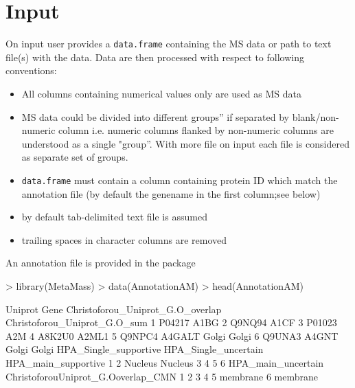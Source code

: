 \documentclass[a4paper]{article}
\numberwithin{equation}{subsection}
\begin{document}
\section{Input}
 On input user provides a
\texttt{data.frame} containing the MS data or path to text file(s)
with the data. Data are
then processed with respect to following conventions:
\begin{itemize}
  \item All columns containing numerical values only are used as MS data
    \item MS data could be divided into different groups'' if separated
      by blank/non-numeric column i.e. numeric columns flanked by
      non-numeric columns are understood as a single "group''.
      With more file on input each file is considered as separate set
      of groups.
    \item \texttt{data.frame} must contain a column containing protein
      ID which match the annotation file (by default the genename in
      the first column;see below)
      \item by default tab-delimited text file is assumed
      \item trailing spaces in character columns are removed
  \end{itemize}
  An annotation file is provided in the package
 \scriptsize
\begin{Schunk}
\begin{Sinput}
> library(MetaMass)
> data(AnnotationAM)
> head(AnnotationAM)
\end{Sinput}
\begin{Soutput}
  Uniprot   Gene Christoforou_Uniprot_G.O_overlap Christoforou_Uniprot_G.O_sum
1  P04217   A1BG                                                              
2  Q9NQ94   A1CF                                                              
3  P01023    A2M                                                              
4  A8K2U0  A2ML1                                                              
5  Q9NPC4 A4GALT                            Golgi                        Golgi
6  Q9UNA3  A4GNT                            Golgi                        Golgi
  HPA_Single_supportive HPA_Single_uncertain HPA_main_supportive
1                                                               
2               Nucleus                                  Nucleus
3                                                               
4                                                               
5                                                               
6                                                               
  HPA_main_uncertain ChristoforouUniprot_G.Ooverlap_CMN
1                                                      
2                                                      
3                                                      
4                                                      
5                                              membrane
6                                              membrane
\end{Soutput}
\end{Schunk}
\normalsize
\end{document}
